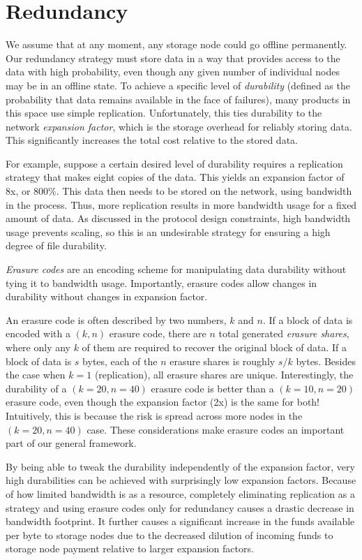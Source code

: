 \documentclass[11pt,fleqn,openany]{book}
\begin{document}
\section{Redundancy}

We assume that at any moment, any storage node could go offline permanently.
Our redundancy
strategy must store data in a way that provides access to the data with high
probability, even though any given number of individual nodes may be in
an offline state. To
achieve a specific level of {\em durability} (defined as the probability that
data remains available in the face of failures), many products in this space use
simple replication. Unfortunately, this ties durability to the network {\em
expansion factor}, which is the storage overhead for reliably storing data. This
significantly increases the total cost relative to the stored data.

For example, suppose a certain desired level of durability requires a
replication strategy that makes eight copies of the data. This yields an
expansion factor of 8x, or 800\%. This data then needs to be stored on the
network, using bandwidth in the process. Thus, more replication results in more
bandwidth usage for a fixed amount of data. As discussed in the protocol design
constraints, high bandwidth usage prevents scaling, so this is an undesirable
strategy for ensuring a high degree of file durability.

{\em Erasure codes} are an encoding scheme for manipulating
data durability without tying it to bandwidth usage. Importantly, erasure
codes allow changes in durability without changes in expansion factor.

An erasure code is often described by two numbers, $k$ and $n$. If a block of
data is encoded with a $(k,n)$ erasure code, there are $n$ total generated {\em
erasure shares}, where only any $k$ of them are required to recover the original
block of data. If a block of data is $s$ bytes, each of the $n$ erasure shares
is roughly $s/k$ bytes. Besides the case when $k=1$ (replication), all erasure
shares are unique. Interestingly, the durability of a $(k=20,n=40)$ erasure code
is better than a $(k=10,n=20)$ erasure code, even though the expansion factor
(2x) is the same for both! Intuitively, this is because the risk is spread
across more nodes in the $(k=20,n=40)$ case. These considerations make erasure
codes an important part of our general framework.

By being able to tweak the durability independently of the expansion factor,
very high durabilities can be achieved with surprisingly low expansion factors.
Because of how limited bandwidth is as a resource, completely eliminating replication as a
strategy and using erasure codes only for redundancy causes a drastic
decrease in bandwidth footprint.
It further causes a significant increase in the funds available per byte to
storage nodes due to the decreased dilution of incoming funds to storage node
payment relative to larger expansion factors.
\end{document}
